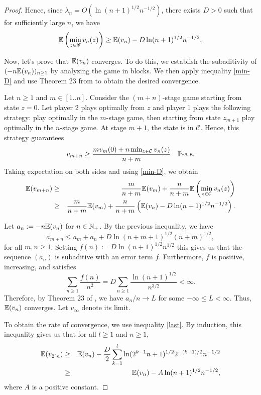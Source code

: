 \begin{proof}
	Hence, since $\lambda_n = O(\ln(n+1)^{1/2}n^{-1/2})$, there exists $D > 0$ such that for sufficiently large $n$, we have
	\begin{equation}\label{min-D}
		\mathbb{E}\left(\min_{z\in \mathscr{C}}v_n(z)\right) \geq \mathbb{E}(v_n) - D\ln(n+1)^{1/2}n^{-1/2}.
	\end{equation}

	Now, let's prove that $\mathbb{E}(v_n)$ converges. To do this, we establish the subaditivity of $(-n\mathbb{E}(v_n))_{n \geq 1}$ by analyzing the game in blocks. We then apply inequality \eqref{min-D} and use Theorem 23 from \cite{deBrujinErdos52} to obtain the desired convergence. 

	Let $n \geq 1$ and $m \in [1..n]$. Consider the $(m + n)$-stage game starting from state $z = 0$. Let player 2 plays optimally from $z$ and player 1 plays the following strategy: play optimally in the $m$-stage game, then starting from state $z_{m+1}$ play optimally in the $n$-stage game. At stage $m+1$, the state is in $\mathcal{C}$. Hence, this strategy guarantees 
	$$
		v_{m+n} \geq \frac{mv_m(0) + n\min_{z \in \mathcal{C}}v_n(z)}{n + m} \quad \mathbb{P}\text{-a.s.} 
	$$
	Taking expectation on both sides and using \eqref{min-D}, we obtain
	\begin{eqnarray} \notag
		\mathbb{E}(v_{m+n}) & \geq & \frac{m}{n + m}\mathbb{E}(v_m) + \frac{n}{n + m}\mathbb{E}\left(\min_{z \in \mathcal{C}}v_n(z)\right) \\ \label{last}
					& \geq & \frac{m}{n + m}\mathbb{E}(v_m) + \frac{n}{n + m}\left(\mathbb{E}(v_n) - D\ln(n+1)^{1/2}n^{-1/2}\right).
	\end{eqnarray}
	
	Let $a_n := -n\mathbb{E}(v_n)$ for $n \in \mathbb{N}_+$. By the previous inequality, we have
	\begin{equation*}
		a_{m+n} \leq a_m + a_n + D\ln(n+m+1)^{1/2}(n+m)^{1/2},
	\end{equation*}
	for all $m, n \geq 1$. Setting $f(n) := D\ln(n+1)^{1/2}n^{1/2}$ this gives us that the sequence $(a_n)$ is subaditive with an error term $f$. Furthermore, $f$ is positive, increasing, and satisfies
	\[
		\sum_{n\geq 1}\frac{f(n)}{n^2} = D\sum_{n\geq 1}\frac{\ln (n+1)^{1/2}}{n^{3/2}} < \infty.
	\]
	Therefore, by Theorem 23 of \cite{deBrujinErdos52}, we have $a_n/n \to L$ for some $-\infty \leq L < \infty$. Thus, $\mathbb{E}(v_n)$ converges. Let $v_{\infty}$ denote its limit. 

	To obtain the rate of convergence, we use inequality \eqref{last}. By induction, this inequality gives us that for all $l \geq 1$ and $n \geq 1$, 
	\begin{eqnarray} \notag
		\mathbb{E}(v_{2^ln}) & \geq & \mathbb{E}(v_n) - \frac{D}{2} \sum_{k = 1}^{l}\ln(2^{k-1}n + 1)^{1/2}2^{-(k-1)/2}n^{-1/2}\\
					 & \geq & \mathbb{E}(v_n) - A \ln(n + 1)^{1/2}n^{-1/2},
	\end{eqnarray}
	where $A$ is a positive constant. 


\end{proof}
